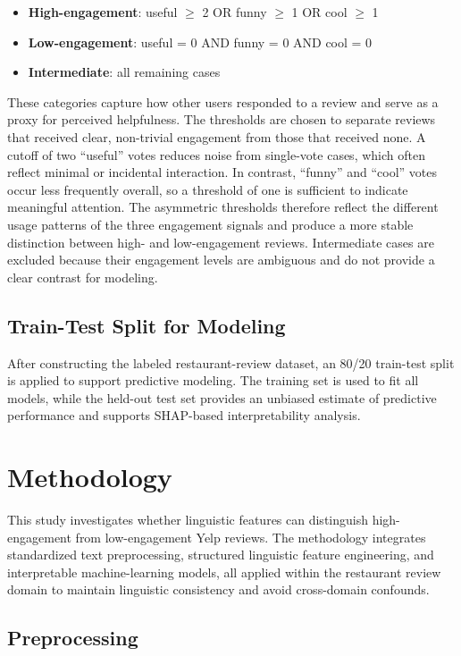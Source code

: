 \documentclass[12pt]{article}
\begin{document}
\begin{itemize}
\item \textbf{High-engagement}: useful $\ge$ 2 OR funny $\ge$ 1 OR cool $\ge$ 1
\item \textbf{Low-engagement}: useful = 0 AND funny = 0 AND cool = 0
\item \textbf{Intermediate}: all remaining cases
\end{itemize}

These categories capture how other users responded to a review and serve as a proxy for perceived helpfulness. The thresholds are chosen to separate reviews that received clear, non-trivial engagement from those that received none. A cutoff of two “useful” votes reduces noise from single-vote cases, which often reflect minimal or incidental interaction. In contrast, “funny” and “cool” votes occur less frequently overall, so a threshold of one is sufficient to indicate meaningful attention. The asymmetric thresholds therefore reflect the different usage patterns of the three engagement signals and produce a more stable distinction between high- and low-engagement reviews. Intermediate cases are excluded because their engagement levels are ambiguous and do not provide a clear contrast for modeling.

\subsection{Train-Test Split for Modeling}
After constructing the labeled restaurant-review dataset, an 80/20 train-test split is applied to support predictive modeling. The training set is used to fit all models, while the held-out test set provides an unbiased estimate of predictive performance and supports SHAP-based interpretability analysis.
 

\section{Methodology}

This study investigates whether linguistic features can distinguish high-engagement from low-engagement Yelp reviews. The methodology integrates standardized text preprocessing, structured linguistic feature engineering, and interpretable machine-learning models, all applied within the restaurant review domain to maintain linguistic consistency and avoid cross-domain confounds.

\subsection{Preprocessing}
\end{document}

